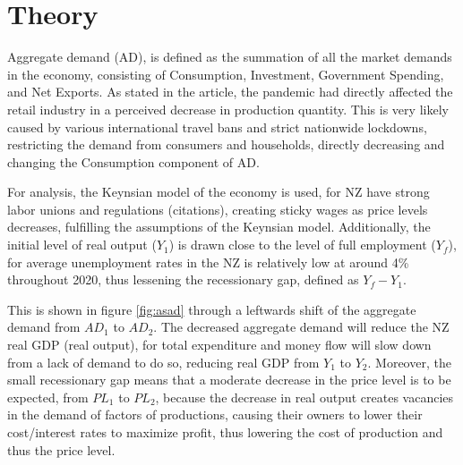 \documentclass[a4paper,12pt]{article}
\begin{document}
\section*{Theory}
Aggregate demand (AD), is defined as the summation of all the market demands in the economy, consisting of Consumption, Investment, Government Spending, and Net Exports. As stated in the article, the pandemic had directly affected the retail industry in a perceived decrease in production quantity. This is very likely caused by various international travel bans and strict nationwide lockdowns, restricting the demand from consumers and households, directly decreasing and changing the Consumption component of AD.

For analysis, the Keynsian model of the economy is used, for NZ have strong labor unions and regulations (citations), creating sticky wages as price levels decreases, fulfilling the assumptions of the Keynsian model. Additionally, the initial level of real output ($Y_1$) is drawn close to the level of full employment ($Y_f$), for average unemployment rates in the NZ is relatively low at around 4\% throughout 2020, thus lessening the recessionary gap, defined as $Y_f-Y_1$.

This is shown in figure \ref{fig:asad} through a leftwards shift of the aggregate demand from $AD_1$ to $AD_2$. The decreased aggregate demand will reduce the NZ real GDP (real output), for total expenditure and money flow will slow down from a lack of demand to do so, reducing real GDP from $Y_1$ to $Y_2$. Moreover, the small recessionary gap means that a moderate decrease in the price level is to be expected, from $PL_1$ to $PL_2$, because the decrease in real output creates vacancies in the demand of factors of productions, causing their owners to lower their cost/interest rates to maximize profit, thus lowering the cost of production and thus the price level.
\end{document}

